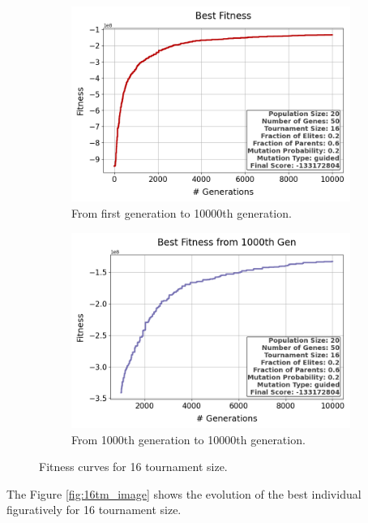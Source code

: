 \documentclass{assignment}
\begin{document}
\begin{figure}[h!]
    \begin{subfigure}{0.5\textwidth}
        \includegraphics[width=\textwidth]{figures/best_fitness_output_20_50_16_0.2_0.6_0.2_guided.png}
        \caption{From first generation to 10000th generation.}
    \end{subfigure}\hfill
    \begin{subfigure}{0.5\textwidth}
        \includegraphics[width=\textwidth]{figures/best_fitness_1000_output_20_50_16_0.2_0.6_0.2_guided.png}
        \caption{From 1000th generation to 10000th generation.}
    \end{subfigure}
    \caption{Fitness curves for 16 tournament size.}
\label{fig:16tm}
\end{figure}

The Figure \ref{fig:16tm_image} shows the evolution of the best individual figuratively for 16 tournament size.
\end{document}
